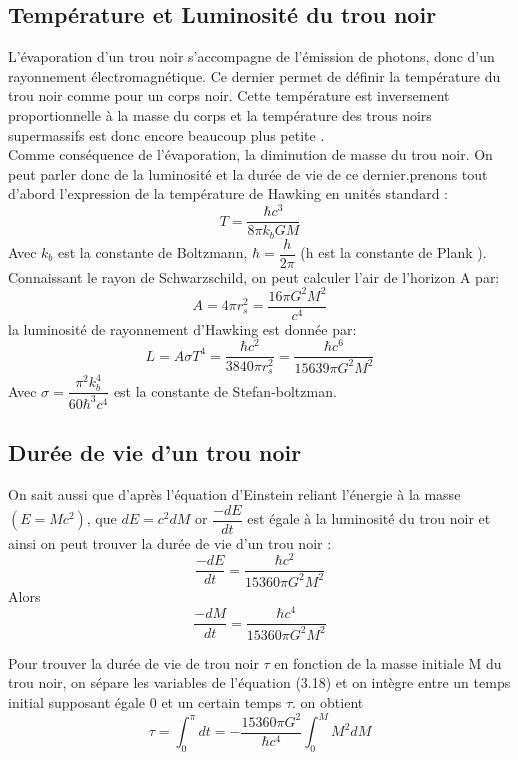 \documentclass[12pt,  a4paper, openright]{report} %
\begin{document}
\subsection{Température et Luminosité du trou noir}
L'évaporation d'un trou noir s'accompagne de l'émission de photons, donc d'un rayonnement électromagnétique. Ce dernier permet de définir la température du trou noir comme pour un corps noir.  Cette température est inversement proportionnelle à la masse du corps et la température des trous noirs supermassifs est donc encore beaucoup plus petite \cite{14}.\\
Comme conséquence de l'évaporation, la diminution de masse du trou noir. On peut parler
donc de la luminosité et la durée de vie de ce dernier.prenons tout d'abord l'expression de la température de Hawking en unités standard :
\begin{equation}
T=\dfrac{\hbar c^{3}}{8\pi k_{b}GM}
\end{equation}
Avec $k_{b}$ est la constante de Boltzmann, $\hbar = \dfrac{h}{2\pi}$ (h
est la constante de Plank ).\\
Connaissant le rayon de Schwarzschild, on peut calculer l'air de l'horizon A par:
\begin{equation}
A=4\pi r_{s}^{2}=\dfrac{16 \pi G^{2}M^{2}}{c^{4}}
\end{equation}
la luminosité de rayonnement d'Hawking est donnée par:
\begin{equation}
L=A\sigma T^{4}=\dfrac{\hbar c^{2}}{3840\pi r_{s}^{2}}=\dfrac{\hbar c^{6}}{15639\pi G^{2}M^{2}}
\end{equation}
Avec $\sigma = \dfrac{\pi^{2}k_{b}^{4}}{60\hbar^{3}c^{4}}$ \cite{15} est la constante de Stefan-boltzman.
\subsection{Durée de vie d’un trou noir}
On sait aussi que d'après l'équation d'Einstein reliant l'énergie à la masse $(E = Mc^{2})$, que
$dE = c^{2}dM$ or $\dfrac{-dE}{dt}$ est égale à la luminosité du trou noir et ainsi on peut trouver la durée de vie d'un trou noir :
\begin{equation}
\dfrac{-dE}{dt}=\dfrac{\hbar c^{2}}{15360\pi G^{2}M^{2}}
\end{equation}
Alors
\begin{equation}
\dfrac{-dM}{dt}=\dfrac{\hbar c^{4}}{15360\pi G^{2}M^{2}}
\end{equation}

Pour trouver la durée de vie de trou noir $\tau$ en fonction de la masse initiale M du
trou noir, on sépare les variables de l’équation (3.18) et on intègre entre un temps initial
supposant égale 0 et un certain temps $\tau$. on obtient
\begin{equation}
\tau=\int_0^\pi dt=-\dfrac{15360\pi G^{2}}{\hbar c^{4}}\int_0^M M^{2}dM
\end{equation}
\end{document}
